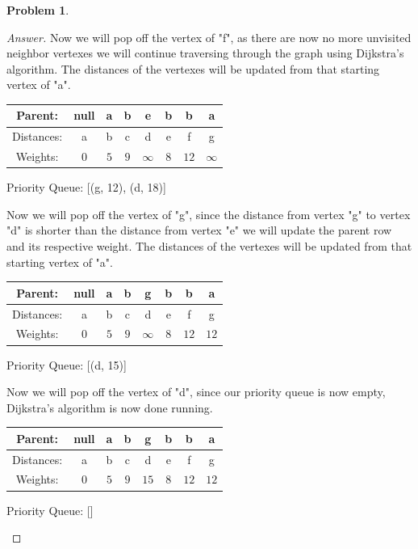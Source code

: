 \documentclass[11pt]{article}
\theoremstyle{definition}
\theoremstyle{definition}
\newtheorem{required}{Problem}
\theoremstyle{definition}
\begin{document}
\begin{required}
\begin{proof}[Answer]
Now we will pop off the vertex of "f", as there are now no more unvisited neighbor vertexes we will continue traversing through the graph using Dijkstra's algorithm. The distances of the vertexes will be updated from that starting vertex of "a".\\
\begin{center}
\begin{tabular}{ | c | c | c | c | c | c | c | c | }
 \hline
 Parent:& null & a &  b & e & b & b & a\\ 
 \hline
 Distances:& a & b & c & d & e & f & g\\  
 \hline
 Weights: & $0$ & $5$ & $9$ & $\infty$ & $8$ & $12$ &$\infty$\\
  \hline
\end{tabular}
\end{center}
\begin{center}
Priority Queue: [(g, 12), (d, 18)]
\end{center}

Now we will pop off the vertex of "g", since the distance from vertex "g" to vertex "d" is shorter than the distance from vertex "e" we will update the parent row and its respective weight. The distances of the vertexes will be updated from that starting vertex of "a".\\
\begin{center}
\begin{tabular}{ | c | c | c | c | c | c | c | c | }
 \hline
 Parent:& null & a &  b & g & b & b & a\\ 
 \hline
 Distances:& a & b & c & d & e & f & g\\  
 \hline
 Weights: & $0$ & $5$ & $9$ & $\infty$ & $8$ & $12$ &$12$\\
  \hline
\end{tabular}
\end{center}
\begin{center}
Priority Queue: [(d, 15)]
\end{center}

Now we will pop off the vertex of "d", since our priority queue is now empty, Dijkstra's algorithm is now done running.\\
\begin{center}
\begin{tabular}{ | c | c | c | c | c | c | c | c | }
 \hline
 Parent:& null & a &  b & g & b & b & a\\ 
 \hline
 Distances:& a & b & c & d & e & f & g\\  
 \hline
 Weights: & $0$ & $5$ & $9$ & $15$ & $8$ & $12$ &$12$\\
  \hline
\end{tabular}
\end{center}
\begin{center}
Priority Queue: []
\end{center}


\end{proof}
\end{required}
\end{document}
